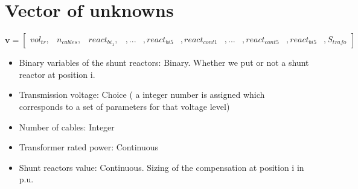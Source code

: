 \documentclass{article}
\begin{document}
\section{Vector of unknowns
}

\[
\mathbf{v} = 
\begin{bmatrix}
vol_{tr}, & n_{cables}, & react_{bi_1}, &, ... &, react_{bi5}&, react_{cont1}&, ... &,react_{cont5}&, react_{bi5}&, S_{trafo}  
\end{bmatrix}
\]


\begin{itemize}
  \item Binary variables of the shunt reactors: Binary. Whether we put or not a shunt reactor at position i. 
  \item Transmission voltage: Choice ( a integer number is assigned which corresponds to a set of parameters for that voltage level)
  \item Number of cables: Integer
  \item Transformer rated power: Continuous
  \item Shunt reactors value: Continuous. Sizing of the compensation at position i in p.u.
\end{itemize}
\end{document}
